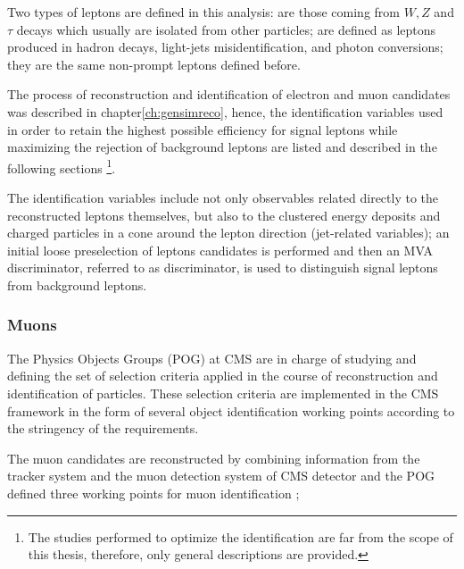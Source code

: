 Two types of leptons are defined in this analysis:  are those coming from $W, Z$ and $\tau$ decays which usually are isolated from other particles;  are defined as leptons produced in \bjet hadron decays, light-jets misidentification, and photon conversions; they are the same non-prompt leptons defined before. 

The process of reconstruction and identification of electron and muon candidates was described in chapter\ref{ch:gensimreco}, hence, the identification variables used in order to retain the highest possible efficiency for signal leptons while maximizing the rejection of background leptons are listed and described in the following sections \footnote{The studies performed to optimize the identification are far from the scope of this thesis, therefore, only general descriptions are provided.}.

The identification variables include not only observables related directly to the reconstructed leptons themselves, but also to the clustered energy deposits and charged particles in a cone around the lepton direction (jet-related variables); an initial loose preselection of leptons candidates is performed and then an MVA discriminator, referred to as  discriminator, is used to distinguish signal leptons from background leptons.

\subsubsection*{Muons}

The Physics Objects Groups (POG) at CMS are in charge of studying and defining the set of selection criteria applied in the course of reconstruction and identification of particles. These selection criteria are implemented in the CMS framework in the form of several object identification working points according to the stringency of the requirements.

The muon candidates are reconstructed by combining information from the tracker system and the muon detection system of CMS detector and the POG defined three working points for muon identification \cite{muid};

